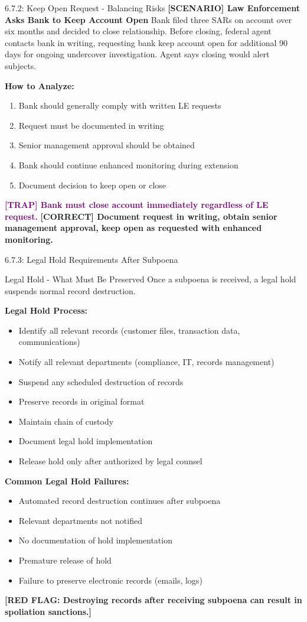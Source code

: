 \documentclass[11pt,a4paper]{beamer}
\newcommand{\trap}[1]{\textcolor{purple}{\textbf{[TRAP] #1}}}
\newcommand{\correct}[1]{\textcolor{green!50!black}{\textbf{[CORRECT] #1}}}
\newcommand{\scenario}[1]{\textcolor{blue!70!black}{\textbf{[SCENARIO] #1}}}
\newcommand{\redflag}[1]{\textcolor{red!80!black}{\textbf{[RED FLAG: #1]}}}
\begin{document}
\begin{frame}{6.7.2: Keep Open Request - Balancing Risks}
	\scenario{Law Enforcement Asks Bank to Keep Account Open}
	Bank filed three SARs on account over six months and decided to close relationship. Before closing, federal agent contacts bank in writing, requesting bank keep account open for additional 90 days for ongoing undercover investigation. Agent says closing would alert subjects.
	
	\vspace{0.1cm}
	\textbf{How to Analyze:}
	\begin{enumerate}
		\item Bank should generally comply with written LE requests
		\item Request must be documented in writing
		\item Senior management approval should be obtained
		\item Bank should continue enhanced monitoring during extension
		\item Document decision to keep open or close
	\end{enumerate}
	\trap{Bank must close account immediately regardless of LE request.}
	\correct{Document request in writing, obtain senior management approval, keep open as requested with enhanced monitoring.}
\end{frame}

\begin{frame}{6.7.3: Legal Hold Requirements After Subpoena}
	\begin{block}{Legal Hold - What Must Be Preserved}
		Once a subpoena is received, a legal hold suspends normal record destruction.
	\end{block}
	\textbf{Legal Hold Process:}
	\begin{itemize}
		\item Identify all relevant records (customer files, transaction data, communications)
		\item Notify all relevant departments (compliance, IT, records management)
		\item Suspend any scheduled destruction of records
		\item Preserve records in original format
		\item Maintain chain of custody
		\item Document legal hold implementation
		\item Release hold only after authorized by legal counsel
	\end{itemize}
	\textbf{Common Legal Hold Failures:}
	\begin{itemize}
		\item Automated record destruction continues after subpoena
		\item Relevant departments not notified
		\item No documentation of hold implementation
		\item Premature release of hold
		\item Failure to preserve electronic records (emails, logs)
	\end{itemize}
	\redflag{Destroying records after receiving subpoena can result in spoliation sanctions.}
\end{frame}
\end{document}
